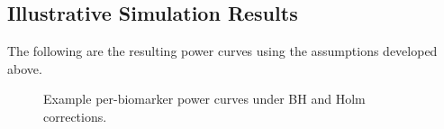 \documentclass[11pt]{article}
\begin{document}
\subsection{Illustrative Simulation Results}

The following are the resulting power curves using the assumptions developed above.

\begin{figure}[htbp]
\centering
{}
\caption{Example per-biomarker power curves under BH and Holm corrections.}
\label{fig:biomarker_power}
\end{figure}
\end{document}
